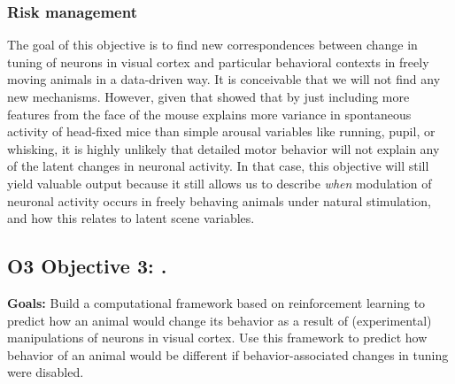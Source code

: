 \documentclass[B2,COG]{ercgrant}
\begin{document}
\subsubsection{Risk management} 
The goal of this objective is to find new correspondences between change in tuning of neurons in visual cortex and particular behavioral contexts in freely moving animals in a data-driven way.
It is conceivable that we will not find any new mechanisms.
However, given that \textcite{Stringer2019-lt} showed that by just including more features from the face of the mouse explains more variance in spontaneous activity of head-fixed mice than simple arousal variables like running, pupil, or whisking, it is highly unlikely that detailed motor behavior will not explain any of the latent changes in neuronal activity. 
In that case, this objective will still yield valuable output because it still allows us to describe \textit{when} modulation of neuronal activity occurs in freely behaving animals under natural stimulation, and how this relates to latent scene variables. 




\subsection{\colorbox{obj3}{\color{white} O3} Objective 3: \othreetitle .}

\textbf{Goals:} Build a computational framework based on reinforcement learning to predict how an animal would change its behavior as a result of (experimental) manipulations of neurons in visual cortex. Use this framework to predict how behavior of an animal would be different if behavior-associated changes in tuning were disabled. 
\end{document}
